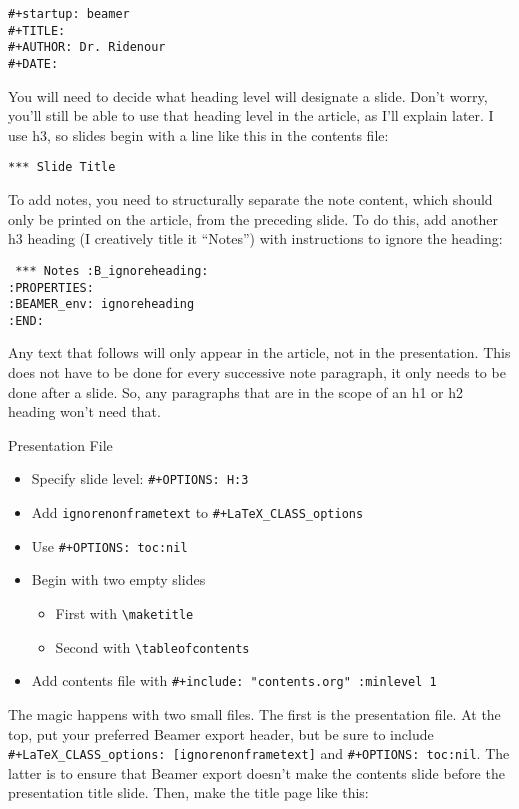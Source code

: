 \documentclass[aspectratio=169,12pt,ignorenonframetext]{beamer}
\begin{document}
\begin{verbatim}
#+startup: beamer
#+TITLE:
#+AUTHOR: Dr. Ridenour
#+DATE:
\end{verbatim}

You will need to decide what heading level will designate a slide. Don't worry, you'll still be able to use that heading level in the article, as I'll explain later. I use h3, so slides begin with a line like this in the contents file:



\texttt{*** Slide Title}

To add notes, you need to structurally separate the note content, which should only be printed on the article, from the preceding slide. To do this, add another h3 heading (I creatively title it ``Notes'') with instructions to ignore the heading:

\begin{verbatim}
 *** Notes :B_ignoreheading:
:PROPERTIES:
:BEAMER_env: ignoreheading
:END:
\end{verbatim}

Any text that follows will only appear in the article, not in the presentation. This does not have to be done for every successive note paragraph, it only needs to be done after a slide. So, any paragraphs that are in the scope of an h1 or h2 heading won't need that.

\begin{frame}[label={sec:org25d8de9},fragile]{Presentation File}
 \begin{itemize}
\item Specify slide level: \texttt{\#+OPTIONS: H:3}
\item Add \texttt{ignorenonframetext} to \texttt{\#+LaTeX\_CLASS\_options}
\item Use \texttt{\#+OPTIONS: toc:nil}
\item Begin with two empty slides
\begin{itemize}
\item First with \texttt{\textbackslash{}maketitle}
\item Second with \texttt{\textbackslash{}tableofcontents}
\end{itemize}
\item Add contents file with \texttt{\#+include: "contents.org" :minlevel 1}
\end{itemize}
\end{frame}

The magic happens with two small files. The first is the presentation file. At the top, put your preferred Beamer export header, but be sure to include \texttt{\#+LaTeX\_CLASS\_options: [ignorenonframetext]} and \texttt{\#+OPTIONS: toc:nil}. The latter is to ensure that Beamer export doesn't make the contents slide before the presentation title slide.  Then, make the title page like this:
\end{document}
